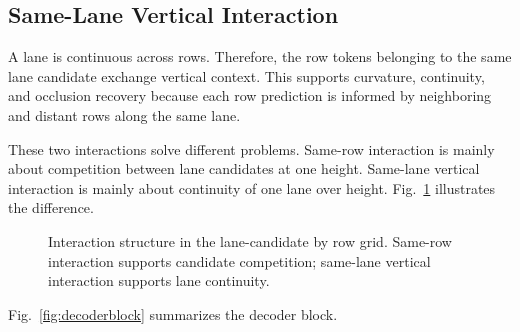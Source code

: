 \documentclass[conference]{IEEEtran}
\begin{document}
\subsection{Same-Lane Vertical Interaction}

A lane is continuous across rows. Therefore, the row tokens belonging to the same lane candidate exchange vertical context. This supports curvature, continuity, and occlusion recovery because each row prediction is informed by neighboring and distant rows along the same lane.

These two interactions solve different problems. Same-row interaction is mainly about competition between lane candidates at one height. Same-lane vertical interaction is mainly about continuity of one lane over height. Fig.~\ref{fig:interactiongrid} illustrates the difference.

\begin{figure}[t]
\centering
{}
\caption{Interaction structure in the lane-candidate by row grid. Same-row interaction supports candidate competition; same-lane vertical interaction supports lane continuity.}
\label{fig:interactiongrid}
\end{figure}

Fig.~\ref{fig:decoderblock} summarizes the decoder block.
\end{document}
